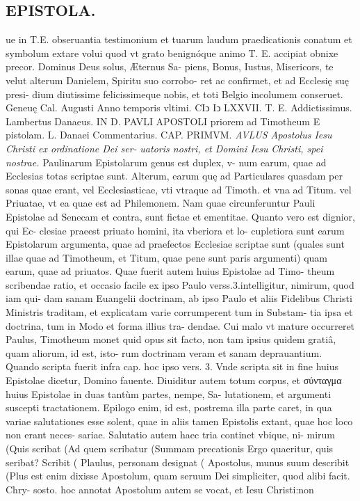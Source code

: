 \documentclass{article}
\begin{document}
\begin{pages}
\section*{EPISTOLA. }ue in T.E. obseruantia testimonium et tuarum laudum praedicationis conatum et symbolum extare volui quod vt grato benignóque animo T. E. accipiat obnixe precor. Dominus Deus solus, Æternus Sa- piens, Bonus, Iustus, Misericors, te velut alterum Danielem, Spiritu suo corrobo- ret ac confirmet, et ad Ecclesię suę presi- dium diutissime felicissimeque nobis, et toti Belgio incolumem conseruet. Geneuę Cal. Augusti Anno temporis vltimi. CIↄ Iↄ LXXVII. T. E. Addictissimus.  Lambertus Danaeus. IN D. PAVLI APOSTOLI priorem ad Timotheum E pistolam. L. Danaei Commentarius. CAP. PRIMVM. \textit{AVLUS Apostolus Iesu} \textit{Christi ex ordinatione Dei ser-} \textit{uatoris nostri, et Domini Iesu} \textit{Christi, spei nostrae.} Paulinarum Epistolarum genus est duplex, v- num earum, quae ad Ecclesias totas scriptae sunt. Alterum, earum quę ad Particulares quasdam per sonas quae erant, vel Ecclesiasticae, vti vtraque ad Timoth. et vna ad Titum. vel Priuatae, vt ea quae est ad Philemonem. Nam quae circunferuntur Pauli Epistolae ad Senecam et contra, sunt fictae et ementitae. Quanto vero est dignior, qui Ec- clesiae praeest priuato homini, ita vberiora et lo- cupletiora sunt earum Epistolarum argumenta, quae ad praefectos Ecclesiae scriptae sunt (quales sunt illae quae ad Timotheum, et Titum, quae pene sunt paris argumenti) quam earum, quae ad 
\textbf{}
\marginpar{[ p.2 ]}priuatos. Quae fuerit autem huius Epistolae ad Timo- theum scribendae ratio, et occasio facile ex ipso Paulo verss.3.intelligitur, nimirum, quod iam qui- dam sanam Euangelii doctrinam, ab ipso Paulo et aliis Fidelibus Christi Ministris traditam, et explicatam varie corrumperent tum in Substam- tia ipsa et doctrina, tum in Modo et forma illius tra- dendae. Cui malo vt mature occurreret Paulus, Timotheum monet quid opus sit facto, non tam ipsius quidem gratiâ, quam aliorum, id est, isto- rum doctrinam veram et sanam deprauantium. Quando scripta fuerit infra cap. hoc ipso vers. 3. Vnde scripta sit in fine huius Epistolae dicetur, Domino fauente. Diuiditur autem totum corpus, et σύνταγμα huius Epistolae in duas tantùm partes, nempe, Sa- lutationem, et argumenti suscepti tractationem. Epilogo enim, id est, postrema illa parte caret, in qua variae salutationes esse solent, quae in aliis tamen Epistolis extant, quae hoc loco non erant neces- sariae. Salutatio autem haec tria continet vbique, ni- mirum (Quis scribat (Ad quem scribatur (Summam precationis Ergo quaeritur, quis seribat? Scribit ( Plaulus, personam designat ( Apostolus, munus suum describit (Plus est enim dixisse Apostolum, quam seruum Dei simpliciter, quod alibi facit. Chry- sosto. hoc annotat Apostolum autem se vocat, et Iesu Christi:non 

\end{pages}
\end{document}
